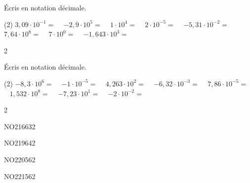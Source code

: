 \documentclass[a4paper,11pt]{report}
\begin{document}
\begin{exop}{
Écris en notation décimale.

\begin{tasks}(2)
        \task $3,09\cdot10^{-1}=$ \hrulefill~
        \task $-2,9\cdot10^{5}=$ \hrulefill~
        \task $1\cdot10^{4}=$ \hrulefill~
        \task $2\cdot10^{-5}=$ \hrulefill~
        \task $-5,31\cdot10^{-2}=$ \hrulefill~
        \task $7,64\cdot10^{8}=$ \hrulefill~
        \task $7\cdot10^{0}=$ \hrulefill~
        \task $-1,643\cdot10^{3}=$ \hrulefill~
    \end{tasks}
}{2}
\end{exop}

\begin{exop}{
Écris en notation décimale.

\begin{tasks}(2)
        \task $-8,3\cdot10^{6}=$ \hrulefill~
        \task $-1\cdot10^{-5}=$ \hrulefill~
        \task $4,263\cdot10^{2}=$ \hrulefill~
        \task $-6,32\cdot10^{-3}=$ \hrulefill~
        \task $7,86\cdot10^{-5}=$ \hrulefill~
        \task $1,532\cdot10^{8}=$ \hrulefill~
        \task $-7,23\cdot10^{1}=$ \hrulefill~
        \task $-2\cdot10^{-2}=$ \hrulefill~
    \end{tasks}
}{2}
\end{exop}

\begin{exof}{NO216}{63}{2} %
\end{exof}

\begin{exof}{NO219}{64}{2} %
\end{exof}

\begin{exol}{NO220}{56}{2} %
\end{exol}

\begin{exol}{NO221}{56}{2} %
\end{exol}
\end{document}
